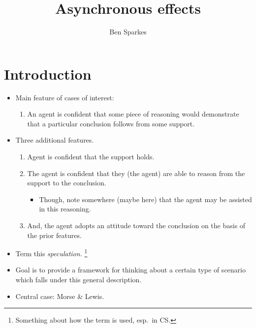 \documentclass[10pt]{article}
\title{Asynchronous effects}
\author{Ben Sparkes}
\begin{document}
\maketitle


\section{Introduction}
\label{sec:introduction}


\begin{itemize}
\item Main feature of cases of interest:
  \begin{enumerate}
  \item An agent is confident that some piece of reasoning would demonstrate that a particular conclusion follows from some support.
  \end{enumerate}
\item Three additional features.
  \begin{enumerate}[resume]
  \item Agent is confident that the support holds.
  \item The agent is confident that they (the agent) are able to reason from the support to the conclusion.
    \begin{itemize}
    \item Though, note somewhere (maybe here) that the agent may be assisted in this reasoning.
    \end{itemize}
  \item And, the agent adopts an attitude toward the conclusion on the basis of the prior features.
  \end{enumerate}
\item Term this \emph{speculation.}\nolinebreak
  \footnote{Something about how the term is used, esp.\ in CS.}
\item Goal is to provide a framework for thinking about a certain type of scenario which falls under this general description.
\item Central case: Morse \& Lewis.
\end{itemize}
\end{document}
